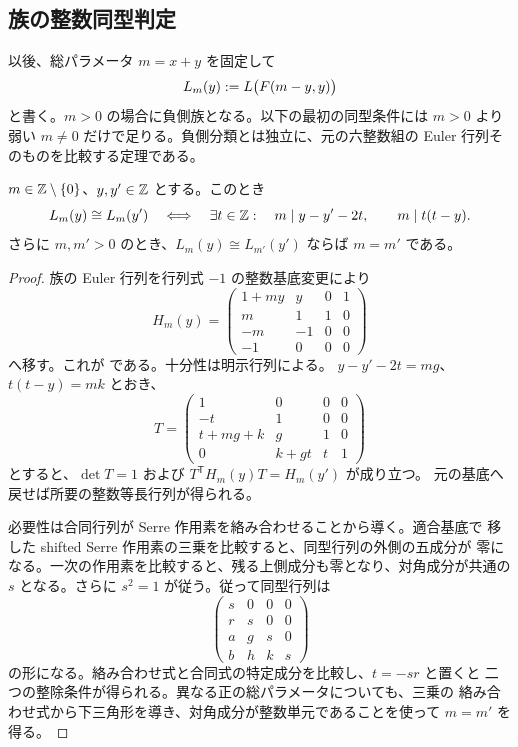\subsection{族の整数同型判定}

以後、総パラメータ $m=x+y$ を固定して
\[
 L_m(y):=L\bigl(F(m-y,y)\bigr)
\]
と書く。$m>0$ の場合に負側族となる。以下の最初の同型条件には $m>0$ より
弱い $m\ne0$ だけで足りる。負側分類とは独立に、元の六整数組の Euler
行列そのものを比較する定理である。

\begin{theorem}[同時合同式による完全同型判定]
\label{bp:fiber-isometry}
\leanok
{}
$m\in\mathbb Z\setminus\{0\}$、$y,y'\in\mathbb Z$ とする。このとき
\[
 L_m(y)\cong L_m(y')
 \quad\Longleftrightarrow\quad
 \exists t\in\mathbb Z:\quad
 m\mid y-y'-2t,\qquad m\mid t(t-y).
\]
さらに $m,m'>0$ のとき、$L_m(y)\cong L_{m'}(y')$ ならば $m=m'$ である。
\end{theorem}
\begin{proof}
\leanok
族の Euler 行列を行列式 $-1$ の整数基底変更により
\[
 H_m(y)=
 \begin{pmatrix}
 1+my&y&0&1\\
 m&1&1&0\\
 -m&-1&0&0\\
 -1&0&0&0
 \end{pmatrix}
\]
へ移す。これが  である。十分性は明示行列による。
$y-y'-2t=mg$、$t(t-y)=mk$ とおき、
\[
 T=
 \begin{pmatrix}
 1&0&0&0\\
 -t&1&0&0\\
 t+mg+k&g&1&0\\
 0&k+gt&t&1
 \end{pmatrix}
\]
とすると、$\det T=1$ および $T^{\mathsf T}H_m(y)T=H_m(y')$ が成り立つ。
元の基底へ戻せば所要の整数等長行列が得られる。

必要性は合同行列が Serre 作用素を絡み合わせることから導く。適合基底で
移した shifted Serre 作用素の三乗を比較すると、同型行列の外側の五成分が
零になる。一次の作用素を比較すると、残る上側成分も零となり、対角成分が共通の $s$ となる。さらに
$s^2=1$ が従う。従って同型行列は
\[
 \begin{pmatrix}
 s&0&0&0\\ r&s&0&0\\ a&g&s&0\\ b&h&k&s
 \end{pmatrix}
\]
の形になる。絡み合わせ式と合同式の特定成分を比較し、$t=-sr$ と置くと
二つの整除条件が得られる。異なる正の総パラメータについても、三乗の
絡み合わせ式から下三角形を導き、対角成分が整数単元であることを使って
$m=m'$ を得る。
\end{proof}

